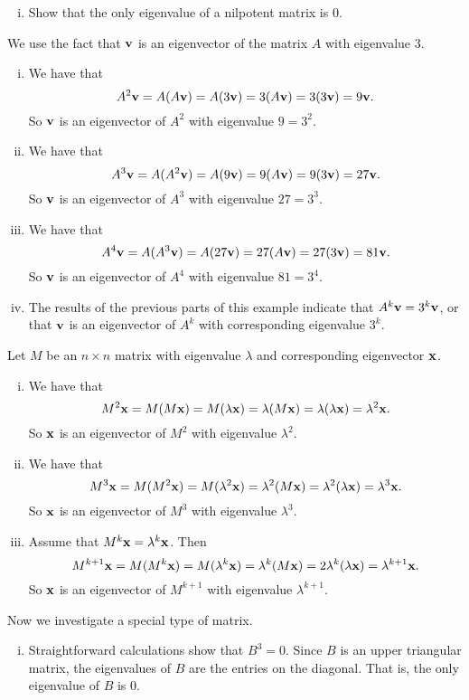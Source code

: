 \begin{example}
\begin{enumerate}[i.]
	\item Show that the only eigenvalue of a nilpotent matrix is $0$.
	\end{enumerate}

\ea
	
\ExampleSolution
\ba
\item We use the fact that $\mathbf{v}$ is an eigenvector of the matrix $A$ with eigenvalue $3$.  	\begin{enumerate}[i.]
	\item We have that 
	\[A^2 \mathbf{v} = A(A\mathbf{v}) = A(3\mathbf{v}) = 3(A\mathbf{v}) = 3(3\mathbf{v}) = 9\mathbf{v}.\]
	So $\mathbf{v}$ is an eigenvector of $A^2$ with eigenvalue $9 = 3^2$. 
	\item We have that 
	\[A^3 \mathbf{v} = A(A^2\mathbf{v}) = A(9\mathbf{v}) = 9(A\mathbf{v}) = 9(3\mathbf{v}) = 27\mathbf{v}.\]
	So $\mathbf{v}$ is an eigenvector of $A^3$ with eigenvalue $27 = 3^3$. 
	\item We have that 
	\[A^4 \mathbf{v} = A(A^3\mathbf{v}) = A(27\mathbf{v}) = 27(A\mathbf{v}) = 27(3\mathbf{v}) = 81\mathbf{v}.\]
	So $\mathbf{v}$ is an eigenvector of $A^4$ with eigenvalue $81 = 3^4$. 
	\item The results of the previous parts of this example indicate that $A^k \mathbf{v} = 3^k \mathbf{v}$, or that $\mathbf{v}$ is an eigenvector of $A^k$ with corresponding eigenvalue $3^k$.
	\end{enumerate}

\item Let $M$ be an $n \times n$ matrix with eigenvalue $\lambda$ and corresponding eigenvector $\mathbf{x}$.
	\begin{enumerate}[i.]
\item We have that 
	\[M^2 \mathbf{x} = M(M\mathbf{x}) = M(\lambda \mathbf{x}) = \lambda(M\mathbf{x}) = \lambda(\lambda \mathbf{x}) = \lambda^2 \mathbf{x}.\]
	So $\mathbf{x}$ is an eigenvector of $M^2$ with eigenvalue $\lambda^2$. 
	\item We have that 
	\[M^3 \mathbf{x} = M(M^2\mathbf{x}) = M(\lambda^2 \mathbf{x}) = \lambda^2(M\mathbf{x}) = \lambda^2(\lambda \mathbf{x}) = \lambda^3 \mathbf{x}.\]
	So $\mathbf{x}$ is an eigenvector of $M^3$ with eigenvalue $\lambda^3$. 
	\item Assume that $M^k \mathbf{x} = \lambda^k \mathbf{x}$. Then 
	\[M^{k+1} \mathbf{x} = M(M^k\mathbf{x}) = M(\lambda^k \mathbf{x}) = \lambda^k(M\mathbf{x}) = 2\lambda^k(\lambda \mathbf{x}) = \lambda^{k+1} \mathbf{x}.\]
	So $\mathbf{x}$ is an eigenvector of $M^{k+1}$ with eigenvalue $\lambda^{k+1}$. 
	\end{enumerate}

	
\item Now we investigate a special type of matrix.
	\begin{enumerate}[i.]
	\item Straightforward calculations show that $B^3 = 0$. Since $B$ is an upper triangular matrix, the eigenvalues of $B$ are the entries on the diagonal. That is, the only eigenvalue of $B$ is $0$.
	

\end{enumerate}
\end{example}
